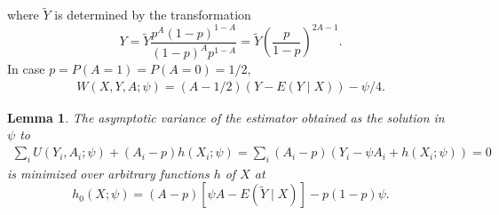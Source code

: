 \message{ !name(manuscript.tex)}\documentclass[10pt,a4paper]{amsart}
\newtheorem{lemma}[theorem]{Lemma}
\newcommand{\EE}{E}
\newcommand{\PP}{P}
\begin{document}
where $\tilde{Y}$ is determined by the transformation
\[
  Y = \tilde{Y}\frac{p^A(1-p)^{1-A}}{(1-p)^Ap^{1-A}}=\tilde{Y}\left(\frac{p}{1-p}\right)^{2A-1}.
\]
In case $p=\PP(A=1)=\PP(A=0)=1/2,$
\begin{align}
  W(X,Y,A;\psi) = (A-1/2)(Y-\EE(Y\mid X)) - \psi/4.\label{eqn:W_basic}
\end{align}

\begin{lemma}\label{lemma:min_h}
  The asymptotic variance of the estimator obtained as the solution in $\psi$ to
  \begin{align}
    \sum_iU(Y_i,A_i;\psi) + (A_i-p)h(X_i;\psi)=\sum_i (A_i-p)(Y_i-\psi A_i + h(X_i;\psi))=0\label{eqn:min_h}
  \end{align}
  is minimized over arbitrary functions $h$ of $X$ at
  \[ h_0(X;\psi)=(A-p)[\psi A - \EE(\tilde{Y}\mid X)] - p(1-p)\psi.\]

\end{lemma}
\end{document}
